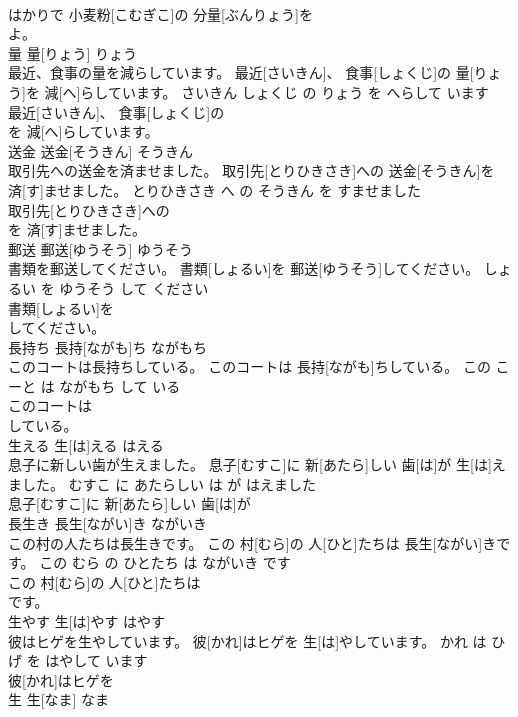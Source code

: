 \documentclass[8pt]{extreport}
\begin{document}
\begin{CJK}{UTF8}{min}
\\	はかりで 小麦粉[こむぎこ]の 分量[ぶんりょう]を
\\	よ。			
\\	量	量[りょう]	りょう	
\\	最近、食事の量を減らしています。	最近[さいきん]、 食事[しょくじ]の 量[りょう]を 減[へ]らしています。	さいきん しょくじ の りょう を へらして います	
\\	最近[さいきん]、 食事[しょくじ]の
\\	を 減[へ]らしています。			
\\	送金	送金[そうきん]	そうきん	
\\	取引先への送金を済ませました。	取引先[とりひきさき]への 送金[そうきん]を 済[す]ませました。	とりひきさき へ の そうきん を すませました	
\\	取引先[とりひきさき]への
\\	を 済[す]ませました。			
\\	郵送	郵送[ゆうそう]	ゆうそう	
\\	書類を郵送してください。	書類[しょるい]を 郵送[ゆうそう]してください。	しょるい を ゆうそう して ください	
\\	書類[しょるい]を
\\	してください。			
\\	長持ち	長持[ながも]ち	ながもち	
\\	このコートは長持ちしている。	このコートは 長持[ながも]ちしている。	この こーと は ながもち して いる	
\\	このコートは
\\	している。			
\\	生える	生[は]える	はえる	
\\	息子に新しい歯が生えました。	息子[むすこ]に 新[あたら]しい 歯[は]が 生[は]えました。	むすこ に あたらしい は が はえました	
\\	息子[むすこ]に 新[あたら]しい 歯[は]が
\\	長生き	長生[ながい]き	ながいき	
\\	この村の人たちは長生きです。	この 村[むら]の 人[ひと]たちは 長生[ながい]きです。	この むら の ひとたち は ながいき です	
\\	この 村[むら]の 人[ひと]たちは
\\	です。			
\\	生やす	生[は]やす	はやす	
\\	彼はヒゲを生やしています。	彼[かれ]はヒゲを 生[は]やしています。	かれ は ひげ を はやして います	
\\	彼[かれ]はヒゲを
\\	生	生[なま]	なま	

\end{CJK}
\end{document}
